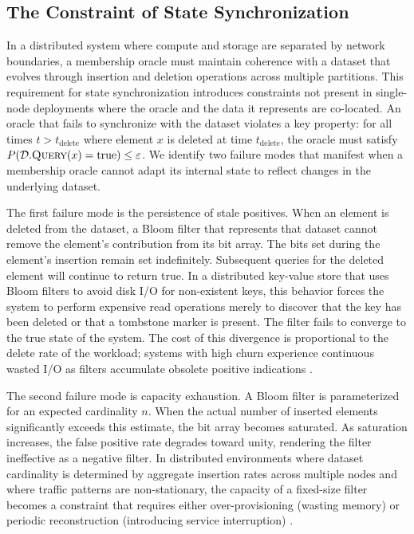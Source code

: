 \subsection{The Constraint of State Synchronization} \label{subsec:bloom-limitations}

In a distributed system where compute and storage are separated by network boundaries, a membership oracle must maintain coherence with a dataset that evolves through insertion and deletion operations across multiple partitions. This requirement for state synchronization introduces constraints not present in single-node deployments where the oracle and the data it represents are co-located. An oracle that fails to synchronize with the dataset violates a key property: for all times $t > t_{\text{delete}}$ where element $x$ is deleted at time $t_{\text{delete}}$, the oracle must satisfy $P(\mathcal{D}.\textsc{Query}(x) = \text{true}) \leq \varepsilon$. We identify two failure modes that manifest when a membership oracle cannot adapt its internal state to reflect changes in the underlying dataset.

The first failure mode is the persistence of stale positives. When an element is deleted from the dataset, a Bloom filter that represents that dataset cannot remove the element's contribution from its bit array. The bits set during the element's insertion remain set indefinitely. Subsequent queries for the deleted element will continue to return true. In a distributed key-value store that uses Bloom filters to avoid disk I/O for non-existent keys, this behavior forces the system to perform expensive read operations merely to discover that the key has been deleted or that a tombstone marker is present. The filter fails to converge to the true state of the system. The cost of this divergence is proportional to the delete rate of the workload; systems with high churn experience continuous wasted I/O as filters accumulate obsolete positive indications \cite{Mosharraf2021ImprovingLA, Tarkoma2012TheoryAP}.

The second failure mode is capacity exhaustion. A Bloom filter is parameterized for an expected cardinality $n$. When the actual number of inserted elements significantly exceeds this estimate, the bit array becomes saturated. As saturation increases, the false positive rate degrades toward unity, rendering the filter ineffective as a negative filter. In distributed environments where dataset cardinality is determined by aggregate insertion rates across multiple nodes and where traffic patterns are non-stationary, the capacity of a fixed-size filter becomes a constraint that requires either over-provisioning (wasting memory) or periodic reconstruction (introducing service interruption) \cite{Almeida2007ScalableBF, Tarkoma2012TheoryAP}.

